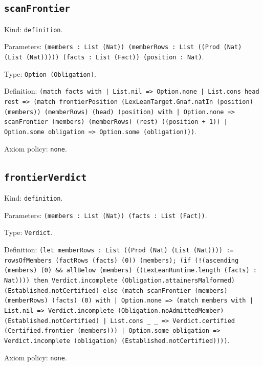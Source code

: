 \documentclass[11pt]{article}
\begin{document}
\subsection*{\texttt{scanFrontier}}
\noindent Kind: \texttt{definition}.\par
\noindent Parameters: \texttt{(members : List (Nat)) (memberRows : List ((Prod (Nat) (List (Nat))))) (facts : List (Fact)) (position : Nat)}.\par
\noindent Type: \texttt{Option (Obligation)}.\par
\noindent Definition: \texttt{(match facts with | List.nil => Option.none | List.cons head rest => (match frontierPosition (LexLeanTarget.Gnaf.natIn (position) (members)) (memberRows) (head) (position) with | Option.none => scanFrontier (members) (memberRows) (rest) ((position + 1)) | Option.some obligation => Option.some (obligation)))}.\par
\noindent Axiom policy: \texttt{none}.\par
\subsection*{\texttt{frontierVerdict}}
\noindent Kind: \texttt{definition}.\par
\noindent Parameters: \texttt{(members : List (Nat)) (facts : List (Fact))}.\par
\noindent Type: \texttt{Verdict}.\par
\noindent Definition: \texttt{(let memberRows : List ((Prod (Nat) (List (Nat)))) := rowsOfMembers (factRows (facts) (0)) (members); (if (!(ascending (members) (0) \&\& allBelow (members) ((LexLeanRuntime.length (facts) : Nat)))) then Verdict.incomplete (Obligation.attainersMalformed) (Established.notCertified) else (match scanFrontier (members) (memberRows) (facts) (0) with | Option.none => (match members with | List.nil => Verdict.incomplete (Obligation.noAdmittedMember) (Established.notCertified) | List.cons \_ \_ => Verdict.certified (Certified.frontier (members))) | Option.some obligation => Verdict.incomplete (obligation) (Established.notCertified))))}.\par
\noindent Axiom policy: \texttt{none}.\par
\end{document}
